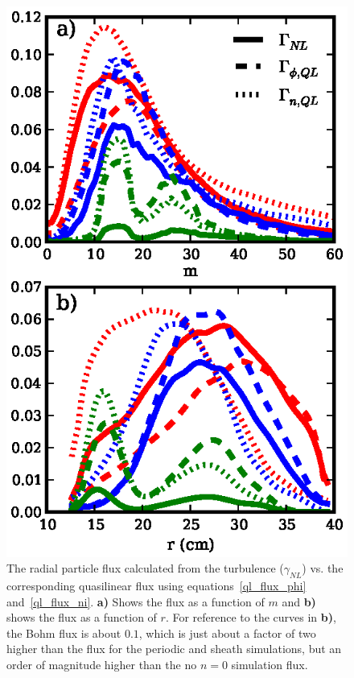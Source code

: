 \documentclass[showpacs,preprintnumbers,amsmath,amssymb,superscriptaddress,aip]{revtex4-1}
\begin{document}
\begin{figure}[!htbp]
\includegraphics[]{flux_comparison}
\hfil
\caption{The radial particle flux calculated from the turbulence ($\gamma_{NL}$) vs. the corresponding quasilinear flux using equations~\ref{ql_flux_phi} and~\ref{ql_flux_ni}. 
\textbf{a)} Shows the flux as a function of $m$ and \textbf{b)} shows the flux as a function of $r$.
For reference to the curves in \textbf{b)}, the Bohm flux is about $0.1$, which is just about a factor of two higher
than the flux for the periodic and sheath simulations, but an order of magnitude higher than the no $n=0$ simulation flux.}
\label{flux_comparison}
\end{figure}
\end{document}
